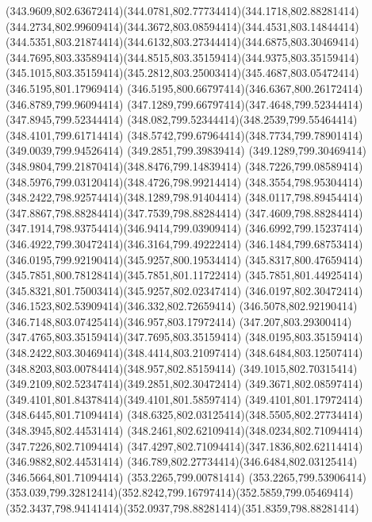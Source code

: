 {{	\curveto(343.9609,802.63672414)(344.0781,802.77734414)(344.1718,802.88281414)
	\curveto(344.2734,802.99609414)(344.3672,803.08594414)(344.4531,803.14844414)
	\curveto(344.5351,803.21874414)(344.6132,803.27344414)(344.6875,803.30469414)
	\curveto(344.7695,803.33589414)(344.8515,803.35159414)(344.9375,803.35159414)
	\curveto(345.1015,803.35159414)(345.2812,803.25003414)(345.4687,803.05472414)
	\closepath
	\moveto(346.5195,801.17969414)
	\curveto(346.5195,800.66797414)(346.6367,800.26172414)(346.8789,799.96094414)
	\curveto(347.1289,799.66797414)(347.4648,799.52344414)(347.8945,799.52344414)
	\curveto(348.082,799.52344414)(348.2539,799.55464414)(348.4101,799.61714414)
	\curveto(348.5742,799.67964414)(348.7734,799.78901414)(349.0039,799.94526414)
	\lineto(349.2851,799.39839414)
	\curveto(349.1289,799.30469414)(348.9804,799.21870414)(348.8476,799.14839414)
	\curveto(348.7226,799.08589414)(348.5976,799.03120414)(348.4726,798.99214414)
	\curveto(348.3554,798.95304414)(348.2422,798.92574414)(348.1289,798.91404414)
	\curveto(348.0117,798.89454414)(347.8867,798.88284414)(347.7539,798.88284414)
	\curveto(347.4609,798.88284414)(347.1914,798.93754414)(346.9414,799.03909414)
	\curveto(346.6992,799.15237414)(346.4922,799.30472414)(346.3164,799.49222414)
	\curveto(346.1484,799.68753414)(346.0195,799.92190414)(345.9257,800.19534414)
	\curveto(345.8317,800.47659414)(345.7851,800.78128414)(345.7851,801.11722414)
	\curveto(345.7851,801.44925414)(345.8321,801.75003414)(345.9257,802.02347414)
	\curveto(346.0197,802.30472414)(346.1523,802.53909414)(346.332,802.72659414)
	\curveto(346.5078,802.92190414)(346.7148,803.07425414)(346.957,803.17972414)
	\curveto(347.207,803.29300414)(347.4765,803.35159414)(347.7695,803.35159414)
	\curveto(348.0195,803.35159414)(348.2422,803.30469414)(348.4414,803.21097414)
	\curveto(348.6484,803.12507414)(348.8203,803.00784414)(348.957,802.85159414)
	\curveto(349.1015,802.70315414)(349.2109,802.52347414)(349.2851,802.30472414)
	\curveto(349.3671,802.08597414)(349.4101,801.84378414)(349.4101,801.58597414)
	\lineto(349.4101,801.17972414)
	\closepath
	\moveto(348.6445,801.71094414)
	\curveto(348.6325,802.03125414)(348.5505,802.27734414)(348.3945,802.44531414)
	\curveto(348.2461,802.62109414)(348.0234,802.71094414)(347.7226,802.71094414)
	\curveto(347.4297,802.71094414)(347.1836,802.62114414)(346.9882,802.44531414)
	\curveto(346.789,802.27734414)(346.6484,802.03125414)(346.5664,801.71094414)
	\closepath
	\moveto(353.2265,799.00781414)
	\lineto(353.2265,799.53906414)
	\curveto(353.039,799.32812414)(352.8242,799.16797414)(352.5859,799.05469414)
	\curveto(352.3437,798.94141414)(352.0937,798.88281414)(351.8359,798.88281414)
}}
